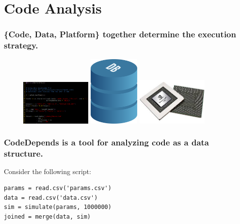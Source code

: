 \documentclass{beamer}
\begin{document}
\section{Code Analysis}
\begin{frame}

    \frametitle{\{Code, Data, Platform\} together determine the execution
    strategy.}

\begin{figure}
            \includegraphics[width=1.4in]{code_screen.png}
            \hfill
            \includegraphics[width=1in]{database.png}
            \hfill
            \includegraphics[width=1.4in]{gpu.jpg}
\end{figure}


\end{frame}
\begin{frame}[fragile]

    \frametitle{CodeDepends is a tool for analyzing code as a data
    structure.}

    Consider the following script:

\begin{verbatim}
params = read.csv('params.csv')
data = read.csv('data.csv')
sim = simulate(params, 1000000)
joined = merge(data, sim)
\end{verbatim}

\end{frame}
\end{document}
